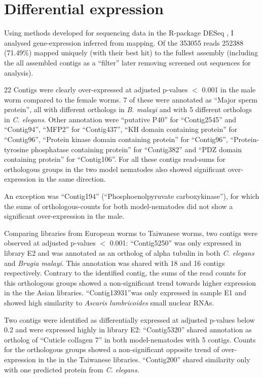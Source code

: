 \section{Differential expression}

Using methods developed for sequencing data in the R-package DESeq
\cite{pmid20979621}, I analysed gene-expression inferred from
mapping. Of the 353055 reads 252388 (71.49\%) mapped uniquely (with
their best hit) to the fullest assembly (including the all assembled
contigs as a ``filter'' later removing screened out sequences for
analysis).

22 Contigs were clearly over-expressed at adjusted p-values $<$ 0.001
in the male worm compared to the female worms.  7 of these were
annotated as ``Major sperm protein'', all with different orthologs in
\textit{B. malayi} and with 5 different orthologs in
\textit{C. elegans}. Other annotation were ``putative P40'' for
``Contig2545'' and ``Contig94'', ``MFP2'' for ``Contig437'', ``KH
domain containing protein'' for ``Contig96'', ``Protein kinase domain
containing protein'' for ``Contig96'', ``Protein-tyrosine phosphatase
containing protein'' for ``Contig382'' and ``PDZ domain containing
protein'' for ``Contig106''. For all these contigs read-sums for
orthologous groups in the two model nematodes also showed significant
over-expression in the same direction.

An exception was ``Contig194'' (``Phosphoenolpyruvate
carboxykinase''), for which the sums of orthologous-counts for both
model-nematodes did not show a significant over-expression in the
male.

Comparing libraries from European worms to Taiwanese worms, two
contigs were observed at adjusted p-values $<$ 0.001: ``Contig5250''
was only expressed in library E2 and was annotated as an ortholog of
alpha tubulin in both \textit{C. elegans} and \textit{Brugia
  malayi}. This annotation was shared with 18 and 16 contigs
respectively. Contrary to the identified contig, the sums of the read
counts for this orthologous groups showed a non-significant trend
towards higher expression in the the Asian
libraries. ``Contig13931''was only expressed in sample E1 and showed
high similarity to \textit{Ascaris lumbricoides} small nuclear RNAs.

Two contigs were identified as differentially expressed at adjusted
p-values below 0.2 and were expressed highly in library E2:
``Contig5320'' shared annotation as ortholog of ``Cuticle collagen 7''
in both model-nematodes with 5 contigs.  Counts for the orthologous
groups showed a non-significant opposite trend of over-expression in
the in the Taiwanese libraries.  ``Contig200'' shared similarity only
with one predicted protein from \textit{C. elegans}.

